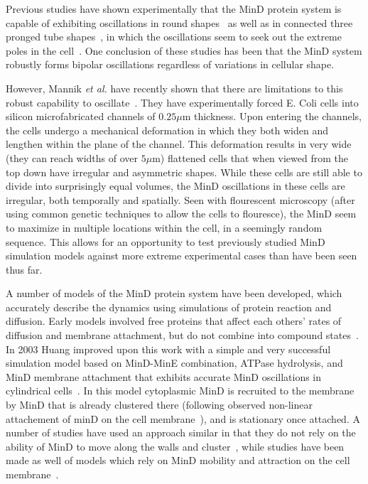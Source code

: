 \documentclass[letterpaper,twocolumn,amsmath,amssymb,pre]{revtex4-1}
\newcommand\micron{\ensuremath{\mu\text{m}}}
\begin{document}
Previous studies have shown experimentally that the MinD protein
system is capable of exhibiting oscillations in round
shapes~\cite{fange2006noise} as well as in connected three pronged
tube shapes~\cite{varma2008min}, in which the oscillations seem to
seek out the extreme poles in the
cell~\cite{juarez2010changes,corbin2002exploring}.  One conclusion of
these studies has been that the MinD system robustly forms bipolar
oscillations regardless of variations in cellular shape.

However, Mannik \emph{et al.} have recently shown that there are
limitations to this robust capability to
oscillate~\cite{mannik2010bacteria, mannik2009bacterial}. They have
experimentally forced E. Coli cells into silicon microfabricated
channels of $0.25\micron$ thickness. Upon entering the channels, the
cells undergo a mechanical deformation in which they both widen and
lengthen within the plane of the channel.  This deformation results in
very wide (they can reach widths of over $5\micron$) flattened cells
that when viewed from the top down have irregular and asymmetric
shapes.  While these cells are still able to divide into surprisingly
equal volumes, the MinD oscillations in these cells are irregular,
both temporally and spatially. Seen with flourescent microscopy (after
using common genetic techniques to allow the cells to flouresce), the
MinD seem to maximize in multiple locations within the cell, in a
seemingly random sequence. This allows for an opportunity to test
previously studied MinD simulation models against more extreme
experimental cases than have been seen thus far.

A number of models of the MinD protein system have been developed,
which accurately describe the dynamics using simulations of protein
reaction and diffusion.
%
Early models involved free proteins that affect each others' rates of
diffusion and membrane attachment, but do not combine into compound
states~\cite{meinhardt2001pattern}.  In 2003 Huang improved upon this
work with a simple and very successful simulation model based on
MinD-MinE combination, ATPase hydrolysis, and MinD membrane attachment
that exhibits accurate MinD oscillations in cylindrical
cells~\cite{huang2003dynamic}. In this model cytoplasmic MinD is
recruited to the membrane by MinD that is already clustered there
(following observed non-linear attachement of minD on the cell
membrane~\cite{hu2002dynamic,shih2002division}), and is stationary
once attached.  A number of studies have used an approach similar in
that they do not rely on the ability of MinD to move along the walls
and cluster~\cite{kruse2007experimentalist, meinhardt2001pattern,
  drew2005polymerization, fange2006noise, kerr2006division}, while
studies have been made as well of models which rely on MinD mobility
and attraction on the cell membrane~\cite{kruse2002dynamic,
  howard2005cellular}.
\end{document}

